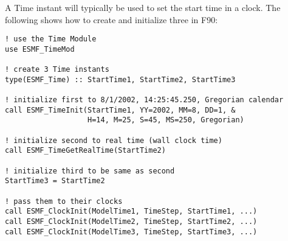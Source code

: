 
A Time instant will typically be used to set the start time in a
clock.  The following shows how to create and initialize three in F90:

\begin{verbatim}
! use the Time Module
use ESMF_TimeMod

! create 3 Time instants
type(ESMF_Time) :: StartTime1, StartTime2, StartTime3

! initialize first to 8/1/2002, 14:25:45.250, Gregorian calendar
call ESMF_TimeInit(StartTime1, YY=2002, MM=8, DD=1, &
                   H=14, M=25, S=45, MS=250, Gregorian)

! initialize second to real time (wall clock time)
call ESMF_TimeGetRealTime(StartTime2)

! initialize third to be same as second
StartTime3 = StartTime2

! pass them to their clocks
call ESMF_ClockInit(ModelTime1, TimeStep, StartTime1, ...)
call ESMF_ClockInit(ModelTime2, TimeStep, StartTime2, ...)
call ESMF_ClockInit(ModelTime3, TimeStep, StartTime3, ...)
\end{verbatim}
